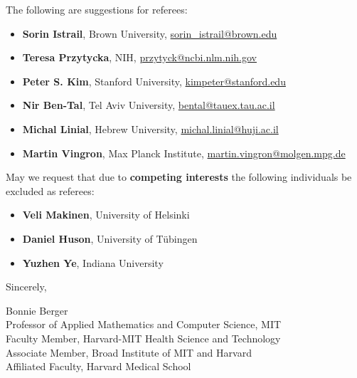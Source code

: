 \documentclass{article}
\newcommand{\email}[1]{\href{mailto:#1}{#1} }
\begin{document}
The following are suggestions for referees:
\begin{itemize}
\item[] \textbf{Sorin Istrail}, Brown University, \email{sorin\_istrail@brown.edu}  %
\item[] \textbf{Teresa Przytycka}, NIH, \email{przytyck@ncbi.nlm.nih.gov}  %
\item[] \textbf{Peter S. Kim}, Stanford University, \email{kimpeter@stanford.edu} %
\item[] \textbf{Nir Ben-Tal}, Tel Aviv University, \email{bental@tauex.tau.ac.il} %
\item[] \textbf{Michal Linial}, Hebrew University, \email{michal.linial@huji.ac.il}
\item[] \textbf{Martin Vingron}, Max Planck Institute, \email{martin.vingron@molgen.mpg.de}
\end{itemize}

May we request that due to \textbf{competing interests} the following individuals be excluded as referees:
\begin{itemize}
\item[] \textbf{Veli Makinen}, University of Helsinki
\item[] \textbf{Daniel Huson}, University of T\"ubingen
\item[] \textbf{Yuzhen Ye}, Indiana University
\end{itemize}


Sincerely,

Bonnie Berger  \\
Professor of Applied Mathematics and Computer Science, MIT  \\
Faculty Member, Harvard-MIT Health Science and Technology\\
Associate Member, Broad Institute of MIT and Harvard \\
Affiliated Faculty, Harvard Medical School
\end{document}

